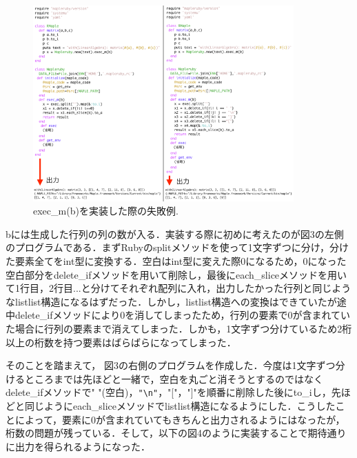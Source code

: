 \begin{figure}[htbp]\begin{center}
\includegraphics[width=10cm,bb= 0 0 737 553]{../figs/./mapleruby_eringi.004.png}
\caption{exec\_m(b)を実装した際の失敗例.}
\label{default}\end{center}\end{figure}
bには生成した行列の列の数が入る．実装する際に初めに考えたのが図3の左側のプログラムである．まずRubyのsplitメソッドを使って1文字ずつに分け，分けた要素全てをint型に変換する．空白はint型に変えた際0になるため，0になった空白部分をdelete\_ifメソッドを用いて削除し，最後にeach\_sliceメソッドを用いて1行目，2行目...と分けてそれぞれ配列に入れ，出力したかった行列と同じようなlistlist構造になるはずだった．しかし，listlist構造への変換はできていたが途中delete\_ifメソッドにより0を消してしまったため，行列の要素で0が含まれていた場合に行列の要素まで消えてしまった．しかも，1文字ずつ分けているため2桁以上の桁数を持つ要素はばらばらになってしまった．

そのことを踏まえて， 図3の右側のプログラムを作成した．今度は1文字ずつ分けるところまでは先ほどと一緒で，空白を丸ごと消そうとするのではなくdelete\_ifメソッドで" "(空白)，\verb|"\n"|，"["，"]"を順番に削除した後にto\_iし，先ほどと同じようにeach\_sliceメソッドでlistlist構造になるようにした．こうしたことによって，要素に0が含まれていてもきちんと出力されるようにはなったが，桁数の問題が残っている．そして，以下の図4のように実装することで期待通りに出力を得られるようになった．

